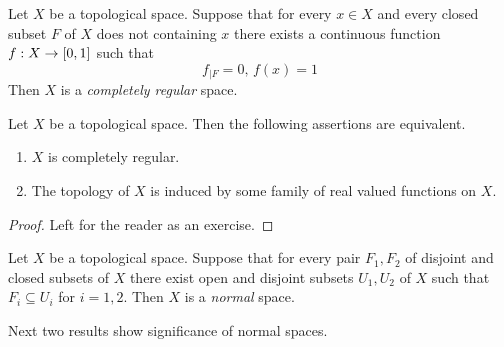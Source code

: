 \begin{definition}
	Let $X$ be a topological space. Suppose that for every $x \in X$ and every closed subset $F$ of $X$ does not containing $x$ there exists a continuous function $f:X\rightarrow [0,1]$ such that
	$$f_{\mid F} = 0,\,f(x) = 1$$
	Then $X$ is a \textit{completely regular} space.
\end{definition}

\begin{fact}\label{fact:characterization_of_completely_regular_spaces}
	Let $X$ be a topological space. Then the following assertions are equivalent.
	\begin{enumerate}[label=\emph{\textbf{(\roman*)}}, leftmargin=3.0em]
		\item $X$ is completely regular.
		\item The topology of $X$ is induced by some family of real valued functions on $X$.
	\end{enumerate}
\end{fact}
\begin{proof}
	Left for the reader as an exercise.
\end{proof}

\begin{definition}
	Let $X$ be a topological space. Suppose that for every pair $F_1,F_2$ of disjoint and closed subsets of $X$ there exist open and disjoint subsets $U_1,U_2$ of $X$ such that $F_i \subseteq U_i$ for $i=1,2$. Then $X$ is a \textit{normal} space.
\end{definition}
\noindent
Next two results show significance of normal spaces.

